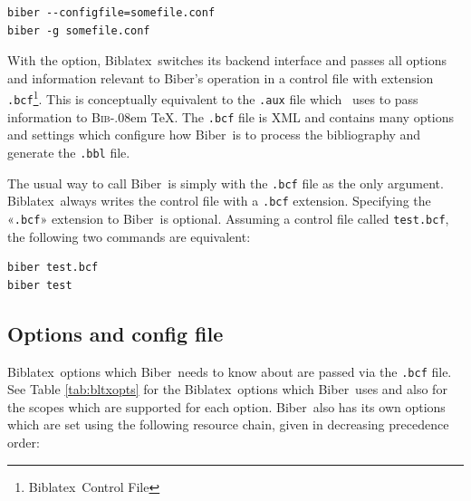 \documentclass{ltxdockit}
\def\BibTeX{\textsc{Bib}\kern-.08em \TeX}
\newcommand*{\biber}{Biber\xspace}
\newcommand*{\biblatex}{Biblatex\xspace}
\begin{document}
\begin{verbatim}
biber --configfile=somefile.conf
biber -g somefile.conf
\end{verbatim}

With the  option, \biblatex\ switches its backend
interface and passes all options and information relevant to \biber's
operation in a control file with extension \verb+.bcf+\footnote{\biblatex\ Control
  File}. This is conceptually equivalent to the \verb+.aux+ file which
\latex\ uses to pass information to \BibTeX. The \verb+.bcf+ file is
XML and contains many options and settings which configure how \biber\
is to process the bibliography and generate the \verb+.bbl+ file.

The usual way to call \biber\ is simply with the \verb+.bcf+ file
as the only argument. \biblatex\ always writes the control file with
a \verb+.bcf+ extension. Specifying the «\verb+.bcf+» extension to
\biber\ is optional. Assuming a control file called
\verb+test.bcf+, the following two commands are equivalent:

\begin{verbatim}
biber test.bcf
biber test
\end{verbatim}

\subsection{Options and config file}
\biblatex\ options which \biber\ needs to know about are passed
via the \verb+.bcf+ file. See Table \ref{tab:bltxopts} for the \biblatex\
options which \biber\ uses and also for the scopes which are supported
for each option. \biber\ also has its own options which are set using
the following resource chain, given in decreasing precedence order:\\[2ex]
\end{document}

